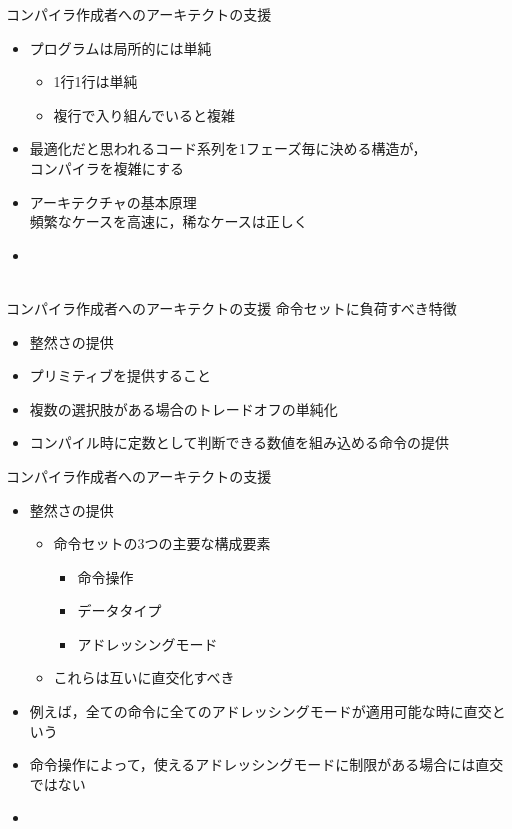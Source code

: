 \documentclass[dvipdfmx]{beamer}
\begin{document}
	\begin{frame}{コンパイラ作成者へのアーキテクトの支援}
		\begin{itemize}
			\item プログラムは局所的には単純
				\begin{itemize}
					\item 1行1行は単純
					\item 複行で入り組んでいると複雑
				\end{itemize}
			\item 最適化だと思われるコード系列を1フェーズ毎に決める構造が，\\コンパイラを複雑にする
			\item アーキテクチャの基本原理\\
				頻繁なケースを高速に，稀なケースは正しく
			\item {}\\\\
		\end{itemize}	
	\end{frame}

	\begin{frame}{コンパイラ作成者へのアーキテクトの支援}
		命令セットに負荷すべき特徴
		\begin{itemize}
			\item 整然さの提供
			\item プリミティブを提供すること
			\item 複数の選択肢がある場合のトレードオフの単純化
			\item コンパイル時に定数として判断できる数値を組み込める命令の提供
		\end{itemize}
	\end{frame}

	\begin{frame}{コンパイラ作成者へのアーキテクトの支援}
		\begin{itemize}
			\item 整然さの提供
				\begin{itemize}
					\item 命令セットの3つの主要な構成要素
						\begin{itemize}
							\item 命令操作
							\item データタイプ
							\item アドレッシングモード
						\end{itemize}
					\item これらは互いに直交化すべき
				\end{itemize}
			\item 例えば，全ての命令に全てのアドレッシングモードが適用可能な時に直交という
			\item 命令操作によって，使えるアドレッシングモードに制限がある場合には直交ではない
			\item {}
		\end{itemize}
	\end{frame}
\end{document}
